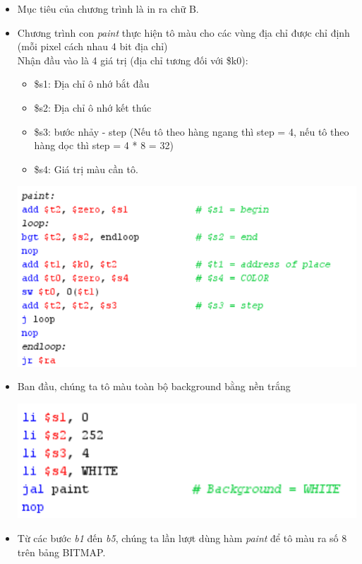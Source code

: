 \documentclass[12pt,a4paper,oneside]{article}
\begin{document}
 \begin{itemize}
 \item Mục tiêu của chương trình là in ra chữ B.
 \item Chương trình con \textit{paint} thực hiện tô màu cho các vùng địa chỉ được chỉ định (mỗi pixel cách nhau 4 bit địa chỉ)\\Nhận đầu vào là 4 giá trị (địa chỉ tương đối với \$k0):
 	\begin{itemize}
 	\item \$s1: Địa chỉ ô nhớ bắt đầu
 	\item \$s2: Địa chỉ ô nhớ kết thúc
 	\item \$s3: bước nhảy - step (Nếu tô theo hàng ngang thì step = 4, nếu tô theo hàng dọc thì step = 4 * 8 = 32)
 	\item \$s4: Giá trị màu cần tô.
 	\end{itemize}
 	\begin{center}
 	\includegraphics[scale=1]{4}
 	\end{center}
 \item Ban đầu, chúng ta tô màu toàn bộ background bằng nền trắng
 \begin{center}
 \includegraphics[scale=1]{5}
 \end{center}
 \item Từ các bước \textit{b1} đến \textit{b5}, chúng ta lần lượt dùng hàm \textit{paint} để tô màu ra số 8 trên bảng BITMAP.
 \begin{center}

\end{center}
\end{itemize}
\end{document}
